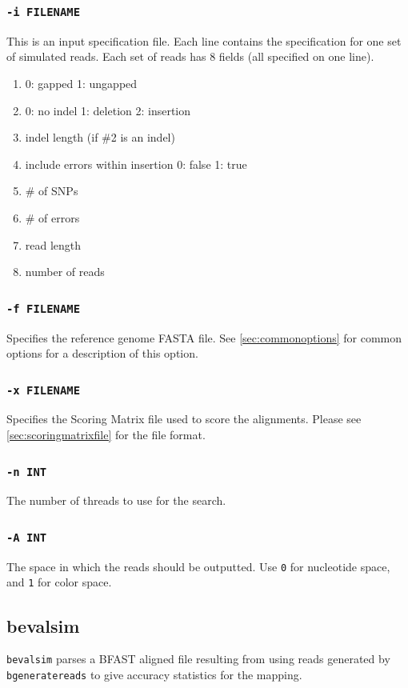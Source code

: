 \documentclass[a4paper,12pt]{book}
\newcommand{\TT}[1]{{\tt #1}} %
\newcommand{\rGFF}{reference genome FASTA file}
\newcommand{\BAF}{BFAST aligned file} %
\begin{document}
\subsubsection{\TT{-i FILENAME}}
This is an input specification file.
Each line contains the specification for one set of simulated reads.
Each set of reads has 8 fields (all specified on one line).
\begin{enumerate}
	\item 0: gapped 1: ungapped
	\item 0: no indel 1: deletion 2: insertion
	\item indel length (if \#2 is an indel)
	\item include errors within insertion 0: false 1: true
	\item \# of SNPs
	\item \# of errors
	\item read length
	\item number of reads
\end{enumerate}

\subsubsection{\TT{-f FILENAME}}
Specifies the \rGFF{}.
See \autoref{sec:commonoptions} for common options for a description of this option.

\subsubsection{\TT{-x FILENAME}}
Specifies the Scoring Matrix file used to score the alignments.
Please see \autoref{sec:scoringmatrixfile} for the file format.

\subsubsection{\TT{-n INT}}
The number of threads to use for the search.

\subsubsection{\TT{-A INT}}
The space in which the reads should be outputted.
Use \TT{0} for nucleotide space, and \TT{1} for color space.

\subsection{bevalsim}
\label{sec:bevalsim}
\TT{bevalsim} parses a \BAF{} resulting from using reads generated by \TT{bgeneratereads} to give accuracy statistics for the mapping.
\end{document}
